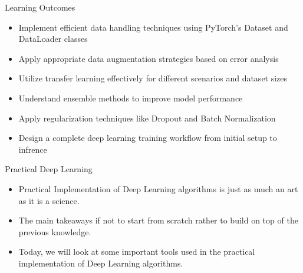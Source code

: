 \documentclass[10pt]{beamer}
\theoremstyle{remark}
\theoremstyle{definition}
\begin{document}
\begin{frame}{Learning Outcomes}
\begin{itemize}
    \item Implement efficient data handling techniques using PyTorch's Dataset and DataLoader classes
    \item Apply appropriate data augmentation strategies based on error analysis
    \item Utilize transfer learning effectively for different scenarios and dataset sizes
    \item Understand ensemble methods to improve model performance
    \item Apply regularization techniques like Dropout and Batch Normalization
    \item Design a complete deep learning training workflow from initial setup to infrence
\end{itemize}
\end{frame}



\begin{frame}{Practical Deep Learning}
\begin{itemize}
    \item Practical Implementation of Deep Learning algorithms is just as much an art as it is a science.
    \item The main takeaways if not to start from scratch rather to build on top of the previous knowledge.
    \item Today, we will look at some important tools used in the practical implementation of Deep Learning algorithms.

\end{itemize}
    
\end{frame}
\end{document}
